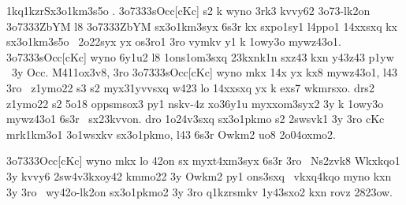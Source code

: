 \zk1kq1kzr{Sx3o1km3s5o \cKc.}
\23o7333{sOcc[cKc]} s2 k wyno 3rk3 kvvy62 3o73-lk2on \23o7333{ZbYM} l8
\23o7333{ZbYM} sx3o1km3syx 6s3r kx sxpo1sy1 l4ppo1 14xxsxq kx
sx3o1km3s5o \cKc\ 2o22syx yx os3ro1 3ro vymkv y1 k 1owy3o mywz43o1.
\23o7333{sOcc[cKc]} wyno 6y1u2 l8 1ons1om3sxq 23kxnk1n sxz43 kxn
y43z43 p1yw \cKc\ 3y Occ.  M411ox3v8, 3ro \23o7333{sOcc[cKc]} wyno mkx
14x yx kx8 mywz43o1, l43 3ro \cKc\ z1ymo22 s3 s2 myx31yvvsxq w423 lo
14xxsxq yx k exs7 wkmrsxo.  drs2 z1ymo22 s2 5o18 oppsmsox3 py1 nskv-4z
xo36y1u myxxom3syx2 3y k 1owy3o mywz43o1 6s3r \cKc\ sx23kvvon.  dro
1o24v3sxq sx3o1pkmo s2 2swsvk1 3y 3ro cKc mrk1km3o1 3o1wsxkv
sx3o1pkmo, l43 6s3r Owkm2 uo8 2o04oxmo2.

%
%
\23o7333{Occ[cKc]} wyno mkx lo 42on sx myxt4xm3syx 6s3r 3ro \cKc\
Ns2zvk8 Wkxkqo1 3y kvvy6 2sw4v3kxoy42 kmmo22 3y Owkm2 py1 ons3sxq
\cKc\ vkxq4kqo myno kxn 3y 3ro \cKc\ wy42o-lk2on sx3o1pkmo2 3y 3ro
q1kzrsmkv 1y43sxo2 kxn rovz 2823ow.


